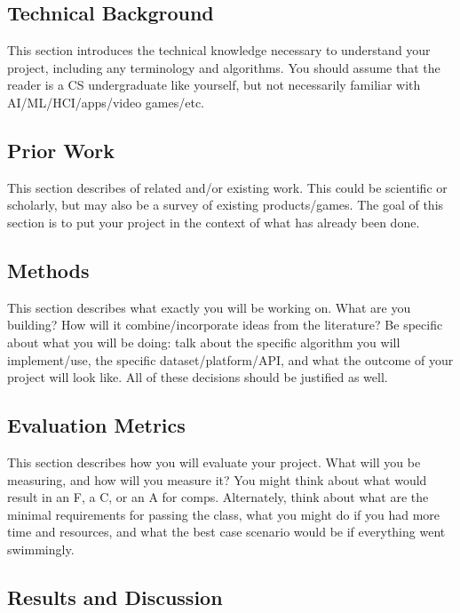 \documentclass[10pt,twocolumn]{article}
\begin{document}
\subsection{Technical Background}

This section introduces the technical knowledge necessary to understand your project, including any terminology and algorithms.
You should assume that the reader is a CS undergraduate like yourself, but not necessarily familiar with AI/ML/HCI/apps/video games/etc.

\subsection{Prior Work}

This section describes of related and/or existing work.
This could be scientific or scholarly, but may also be a survey of existing products/games.
The goal of this section is to put your project in the context of what has already been done.

\subsection{Methods}

This section describes what exactly you will be working on.
What are you building? How will it combine/incorporate ideas from the literature? Be specific about what you will be doing: talk about the specific algorithm you will implement/use, the specific dataset/platform/API, and what the outcome of your project will look like.
All of these decisions should be justified as well.

\subsection{Evaluation Metrics}

This section describes how you will evaluate your project.
What will you be measuring, and how will you measure it?
You might think about what would result in an F, a C, or an A for comps.
Alternately, think about what are the minimal requirements for passing the class, what you might do if you had more time and resources, and what the best case scenario would be if everything went swimmingly.

\subsection{Results and Discussion}
\end{document}
